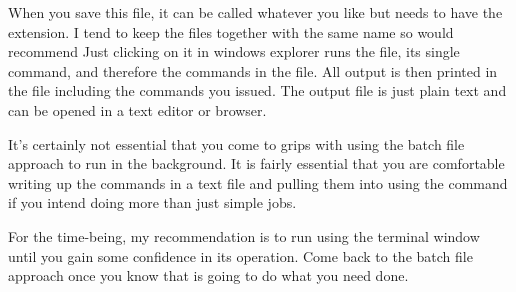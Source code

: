 When you save this file, it can be called whatever you like but needs to have the  extension. I tend to keep the files together with the same name so would recommend Just clicking on it in windows explorer runs the file, its single command, and therefore the commands in the  file. All output is then printed in the  file including the commands you issued. The output file is just plain text and can be opened in a text editor or browser.

It's certainly not essential that you come to grips with using the batch file approach to run \R{} in the background. It is fairly essential that you are comfortable writing up the \R{} commands in a text file and pulling them into \R{} using the  command if you intend doing more than just simple jobs. 

For the time-being, my recommendation is to run \R{} using the terminal window until you gain some confidence in its operation. Come back to the batch file approach once you know that \R{} is going to do what you need done.

